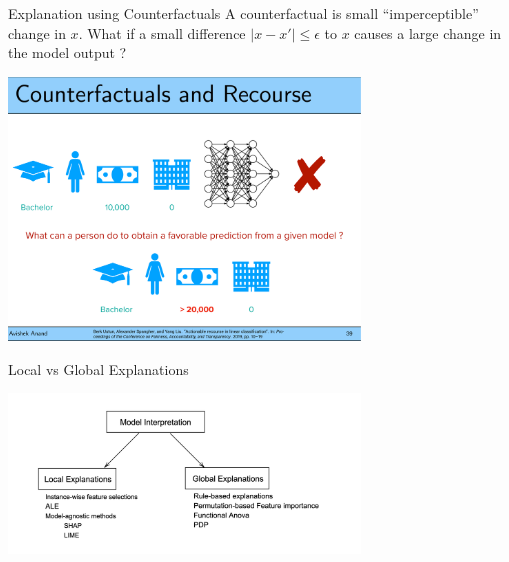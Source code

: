 \documentclass[aspectratio=169]{../latex_main/tntbeamer}  %
\begin{document}
\begin{frame}[c]{Explanation using Counterfactuals}
	\vspace{-1em}
    A counterfactual is small ``imperceptible'' change in $x$. What if a small difference $ |x - x'| \leq \epsilon$ to $x$ causes a large change in the model output ?
	\begin{center}
		\includegraphics[page=1, width=0.7\textwidth]{01_introduction/figure/counterfactual.pdf}
	\end{center}
	
\end{frame}

\begin{frame}[c]{Local vs Global Explanations}
	\begin{center}
		\includegraphics[width=0.7\textwidth]{01_introduction/figure/1-local-global.png}
	\end{center}
\end{frame}
\end{document}
